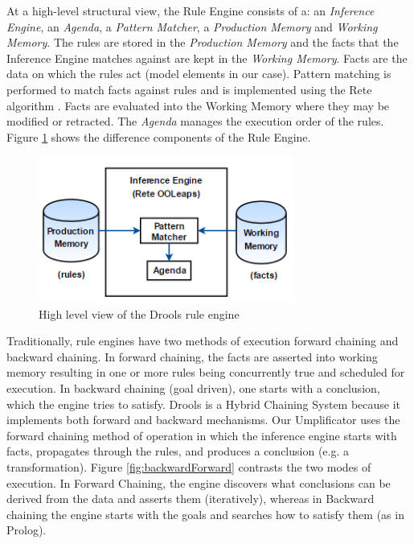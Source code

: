 At a high-level structural view, the Rule Engine consists of a: an \textit{Inference Engine}, an \textit{Agenda}, a \textit{Pattern Matcher}, a \textit{Production Memory} and \textit{Working Memory}. 
The rules are stored in the \textit{Production Memory} and the facts that the Inference Engine matches against are kept in the \textit{Working Memory}.
Facts are the data on which the rules act (model elements in our case).
Pattern matching is performed to match facts against rules and is implemented using the Rete algorithm \cite{reteDROOLS}. Facts are evaluated into the Working Memory where they may be modified or retracted. The \textit{Agenda} manages the execution order of the rules. Figure \ref{fig:RuleEngineArchitecture} shows the difference components of the Rule Engine.

\begin{figure}[h]
\centering
\includegraphics[width=0.75\textwidth]{Figures/RuleEngineArchitecture.png}
\caption{High level view of the Drools rule engine}
\label{fig:RuleEngineArchitecture}
\end{figure}

Traditionally, rule engines have two methods of execution \cite{RulebasedSystems} forward chaining and backward chaining. In forward chaining, the facts are asserted into working memory resulting in one or more rules being concurrently true and scheduled for execution. In backward chaining (goal driven), one starts with a conclusion, which the engine tries to satisfy. Drools is a Hybrid Chaining System because it implements both forward and backward mechanisms. Our Umplificator uses the forward chaining method of operation in which the inference engine starts with facts, propagates through the rules, and produces a conclusion (e.g. a transformation). Figure \ref{fig:backwardForward} contrasts the two modes of execution. In Forward Chaining, the engine discovers what conclusions can be derived from the data and asserts them (iteratively), whereas in Backward chaining the engine starts with the goals and searches how to satisfy them (as in Prolog).


